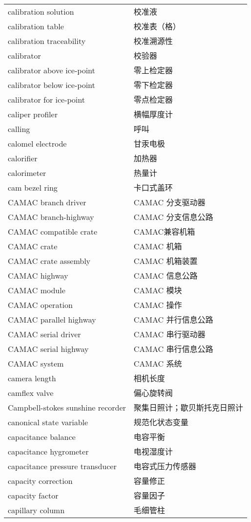 \documentclass[
]{article}
\begin{document}
\begin{longtable}[]{@{}ll@{}}
calibration solution & 校准液 \\
calibration table & 校准表（格） \\
calibration traceability & 校准溯源性 \\
calibrator & 校验器 \\
calibrator above ice-point & 零上检定器 \\
calibrator below ice-point & 零下检定器 \\
calibrator for ice-point & 零点检定器 \\
caliper profiler & 横幅厚度计 \\
calling & 呼叫 \\
calomel electrode & 甘汞电极 \\
calorifier & 加热器 \\
calorimeter & 热量计 \\
cam bezel ring & 卡口式盖环 \\
CAMAC branch driver & CAMAC 分支驱动器 \\
CAMAC branch-highway & CAMAC 分支信息公路 \\
CAMAC compatible crate & CAMAC兼容机箱 \\
CAMAC crate & CAMAC 机箱 \\
CAMAC crate assembly & CAMAC 机箱装置 \\
CAMAC highway & CAMAC 信息公路 \\
CAMAC module & CAMAC 模块 \\
CAMAC operation & CAMAC 操作 \\
CAMAC parallel highway & CAMAC 并行信息公路 \\
CAMAC serial driver & CAMAC 串行驱动器 \\
CAMAC serial highway & CAMAC 串行信息公路 \\
CAMAC system & CAMAC 系统 \\
camera length & 相机长度 \\
camflex valve & 偏心旋转阀 \\
Campbell-stokes sunshine recorder & 聚集日照计；歇贝斯托克日照计 \\
canonical state variable & 规范化状态变量 \\
capacitance balance & 电容平衡 \\
capacitance hygrometer & 电视湿度计 \\
capacitance pressure transducer & 电容式压力传感器 \\
capacity correction & 容量修正 \\
capacity factor & 容量因子 \\
capillary column & 毛细管柱 \\

\end{longtable}
\end{document}
